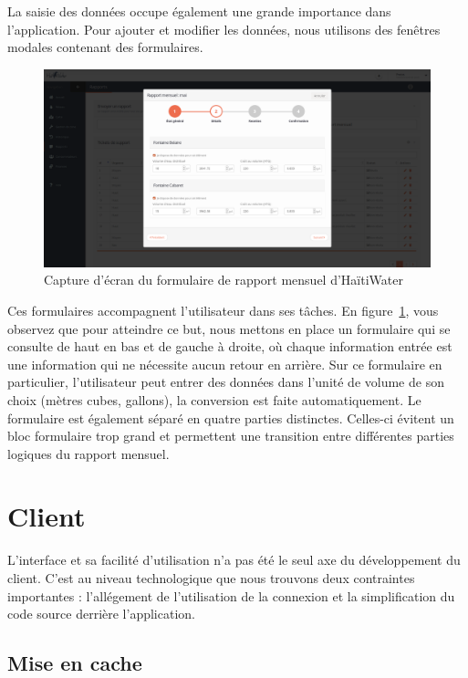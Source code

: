 \documentclass{EPL-master-thesis-covers-FR}
\begin{document}
			La saisie des données occupe également une grande importance dans l'application. Pour ajouter et modifier les données, nous utilisons des fenêtres modales contenant des formulaires.

			\begin{figure}
				\includegraphics[width=\textwidth]{images/screen_rapport_mensuel.png}
				\caption{Capture d'écran du formulaire de rapport mensuel d'HaïtiWater}
				\label{fig:screen_rapport_mensuel}
			\end{figure}

			Ces formulaires accompagnent l'utilisateur dans ses tâches. En figure~\ref{fig:screen_rapport_mensuel}, vous observez que pour atteindre ce but, nous mettons en place un formulaire qui se consulte de haut en bas et de gauche à droite, où chaque information entrée est une information qui ne nécessite aucun retour en arrière. Sur ce formulaire en particulier, l'utilisateur peut entrer des données dans l'unité de volume de son choix (mètres cubes, gallons), la conversion est faite automatiquement. Le formulaire est également séparé en quatre parties distinctes. Celles-ci évitent un bloc formulaire trop grand et permettent une transition entre différentes parties logiques du rapport mensuel.

		\section{Client}

			L'interface et sa facilité d'utilisation n'a pas été le seul axe du développement du client. C'est au niveau technologique que nous trouvons deux contraintes importantes : l'allégement de l'utilisation de la connexion et la simplification du code source derrière l'application.

			\subsection*{Mise en cache}
				\label{sec:cache_client}
\end{document}
